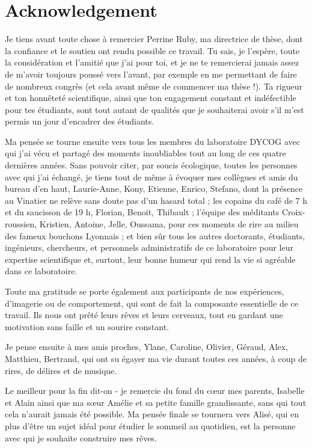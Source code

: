 %
\chapter*{Acknowledgement}
\label{sec:acknowledgement}
\vspace*{-10mm}

Je tiens avant toute chose à remercier Perrine Ruby, ma directrice de thèse, dont la confiance et le soutien ont rendu possible ce travail. Tu sais, je l'espère, toute la considération et l'amitié que j'ai pour toi, et je ne te remercierai jamais assez de m'avoir toujours poussé vers l'avant, par exemple en me permettant de faire de nombreux congrès (et cela avant même de commencer ma thèse !). Ta rigueur et ton honnêteté scientifique, ainsi que ton engagement constant et indéfectible pour tes étudiants, sont tout autant de qualités que je souhaiterai avoir s'il m'est permis un jour d'encadrer des étudiants.

Ma pensée se tourne ensuite vers tous les membres du laboratoire DYCOG avec qui j’ai vécu et partagé des moments inoubliables tout au long de ces quatre dernières années. Sans pouvoir citer, par soucis écologique, toutes les personnes avec qui j’ai échangé, je tiens tout de même à évoquer mes collègues et amis du bureau d’en haut, Laurie-Anne, Kony, Etienne, Enrico, Stefano, dont la présence au Vinatier ne relève sans doute pas d’un hasard total ; les copains du café de 7 h et du saucisson de 19 h, Florian, Benoit, Thibault ; l’équipe des méditants Croix-roussien, Kristien, Antoine, Jelle, Oussama, pour ces moments de rire au milieu des fameux bouchons Lyonnais ; et bien sûr tous les autres doctorants, étudiants, ingénieurs, chercheurs, et personnels administratifs de ce laboratoire pour leur expertise scientifique et, surtout, leur bonne humeur qui rend la vie si agréable dans ce laboratoire.

Toute ma gratitude se porte également aux participants de nos expériences, d’imagerie ou de comportement, qui sont de fait la composante essentielle de ce travail. Ils nous ont prêté leurs rêves et leurs cerveaux, tout en gardant une motivation sans faille et un sourire constant.

Je pense ensuite à mes amis proches, Ylane, Caroline, Olivier, Géraud, Alex, Matthieu, Bertrand, qui ont su égayer ma vie durant toutes ces années, à coup de rires, de délires et de musique.

Le meilleur pour la fin dit-on - je remercie du fond du cœur mes parents, Isabelle et Alain ainsi que ma sœur Amélie et sa petite famille grandissante, sans qui tout cela n'aurait jamais été possible. Ma pensée finale se tournera vers Alisé, qui en plus d’être un sujet idéal pour étudier le sommeil au quotidien, est la personne avec qui je souhaite construire mes rêves.
